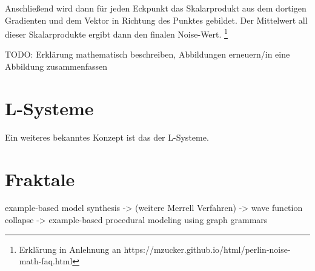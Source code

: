 Anschließend wird dann für jeden Eckpunkt
das Skalarprodukt aus dem dortigen Gradienten und dem Vektor in Richtung des Punktes gebildet. Der Mittelwert all dieser Skalarprodukte ergibt
dann den finalen Noise-Wert. \cite{16_perlin}\footnote{Erklärung in Anlehnung an https://mzucker.github.io/html/perlin-noise-math-faq.html}

TODO: Erklärung mathematisch beschreiben, Abbildungen erneuern/in eine Abbildung zusammenfassen

\section{L-Systeme}
Ein weiteres bekanntes Konzept ist das der L-Systeme.

\section{Fraktale}
\cite{19_mandelbrot_frame}




example-based model synthesis -> (weitere Merrell Verfahren) -> wave function collapse -> example-based procedural modeling using graph grammars